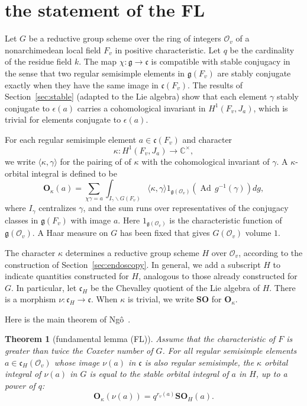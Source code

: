 \documentclass[brochure,english,12pt]{bourbaki}
\theoremstyle{plain}
\newtheorem{theorem}[equation]{Theorem}
\def\op#1{{\operatorname{#1}}}
\newcommand{\ring}[1]{\mathbb{#1}}
\def\SO{{\mathbf {SO}}}
\def\OO{{\mathbf O}}
\def\g{\mathfrak{g}}
\def\cc{\mathfrak{c}}
\def\O{{\mathcal O}}
\begin{document}
\section{the statement of the FL}\label{sec:statement}

Let $G$ be a reductive group scheme over the ring of integers $\O_v$ of
a nonarchimedean local field $F_v$ in positive characteristic.  Let $q$ be the cardinality
of the residue field $k$.  The map $\chi:\g\to\cc$
is compatible with stable conjugacy in the sense that two
regular semisimple elements in $\g(F_v)$ are stably conjugate exactly
when they have the same image in $\cc(F_v)$.    The results of
Section~\ref{sec:stable} (adapted to the Lie algebra)
show that each element $\gamma$ stably conjugate to
$\epsilon(a)$ carries a cohomological invariant in $H^1(F_v,J_a)$, which is trivial for
elements conjugate to $\epsilon(a)$. 

For each regular semisimple element $a\in \cc(F_v)$ and character 
\[
\kappa:H^1(F_v,J_a)\to\ring{C}^\times,
\]
we write
 $\langle\kappa,\gamma\rangle$ for the pairing of
of $\kappa$ with the cohomological invariant of $\gamma$.
A 
$\kappa$-orbital integral is defined to be
\begin{equation}\label{eqn:k-orbital}
\OO_\kappa(a) = \sum_ {\chi\gamma= a} 
\int_{I_\gamma\backslash G(F_v)} \langle\kappa,\gamma\rangle 
1_{\g(\O_v)} (\op{Ad}\, g^{-1}(\gamma)) dg,
\end{equation}
where $I_\gamma$ centralizes $\gamma$, and the sum runs over
representatives of the conjugacy classes in $\g(F_v)$ with image $a$.
Here $1_{\g(\O_v)}$ is the characteristic function of $\g(\O_v)$.  A
Haar measure on $G$ has been fixed that gives $G(\O_v)$ volume $1$.


The character $\kappa$ determines a reductive group scheme $H$ over
$\O_v$, according to the construction of Section~\ref{sec:endoscopy}.
In general, we add
a subscript $H$ to indicate quantities constructed for $H$, analogous
to those already constructed for $G$.  In particular,
let $\cc_H$ be the Chevalley quotient of the Lie algebra of $H$. There is
a morphism $\nu:\cc_H\to\cc$.    When $\kappa$ is trivial, we
write $\SO$ for $\OO_\kappa$.

Here is the main theorem of Ng\^o~\cite{NBC:2010}.

\begin{theorem}[fundamental lemma (FL)]
  Assume that the characteristic of $F$ is greater than twice the
  Coxeter number of $G$.  For all regular semisimple elements $a\in
  \cc_H(\O_v)$ whose image $\nu(a)$ in $\cc$ is also regular
  semisimple, the $\kappa$ orbital integral of $\nu(a)$ in $G$ is
  equal to the stable orbital integral of $a$ in $H$, up to a power of
  $q$:
\[
\OO_\kappa(\nu(a)) = q^{r_v(a)}\SO_H(a).
\]
\end{theorem}
\end{document}
